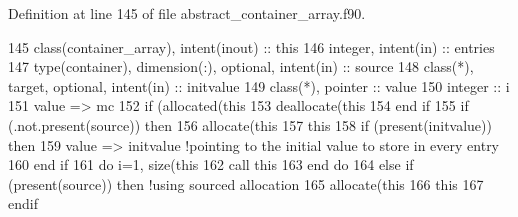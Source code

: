 Definition at line 145 of file abstract\+\_\+container\+\_\+array.\+f90.


\begin{DoxyCode}
145     \textcolor{keywordtype}{class}(container\_array), \textcolor{keywordtype}{intent(inout)} :: this
146     \textcolor{keywordtype}{integer}, \textcolor{keywordtype}{intent(in)} :: entries
147     \textcolor{keywordtype}{type}(container), \textcolor{keywordtype}{dimension(:)}, \textcolor{keywordtype}{optional}, \textcolor{keywordtype}{intent(in)} :: source
148     \textcolor{keywordtype}{class}(*), \textcolor{keywordtype}{target}, \textcolor{keywordtype}{optional}, \textcolor{keywordtype}{intent(in)} :: initvalue
149     \textcolor{keywordtype}{class}(*), \textcolor{keywordtype}{pointer} :: value
150     \textcolor{keywordtype}{integer} :: i
151     \textcolor{keywordtype}{value} => mc
152     \textcolor{keywordflow}{if} (\textcolor{keyword}{allocated}(this%
153         \textcolor{keyword}{deallocate}(this%
154 \textcolor{keywordflow}{    end if}
155     \textcolor{keywordflow}{if} (.not.\textcolor{keyword}{present}(source)) \textcolor{keywordflow}{then}
156         \textcolor{keyword}{allocate}(this%
157         this%
158         \textcolor{keywordflow}{if} (\textcolor{keyword}{present}(initvalue)) \textcolor{keywordflow}{then}
159             \textcolor{keywordtype}{value} => initvalue \textcolor{comment}{!pointing to the initial value to store in every entry}
160 \textcolor{keywordflow}{        end if}
161         \textcolor{keywordflow}{do} i=1, \textcolor{keyword}{size}(this%
162             \textcolor{keyword}{call }this%
163 \textcolor{keywordflow}{        end do}
164     \textcolor{keywordflow}{else} \textcolor{keywordflow}{if} (\textcolor{keyword}{present}(source)) \textcolor{keywordflow}{then} \textcolor{comment}{!using sourced allocation}
165         \textcolor{keyword}{allocate}(this%
166         this%
167 \textcolor{keywordflow}{    endif}
\end{DoxyCode}
\mbox{\label{namespaceabstract__container__array__mod_aae1f6309c51e282a528ce78f128443e0}} 
